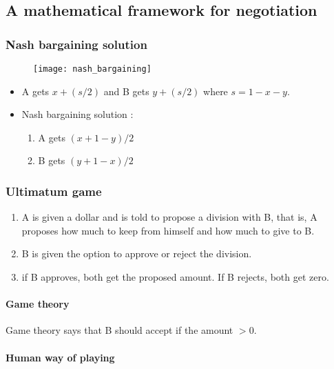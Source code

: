 \subsection{A mathematical framework for negotiation}

\subsubsection{Nash bargaining solution}

\begin{figure}[H]
    \centering
    \texttt{[image: nash\_bargaining]}
\end{figure}

\begin{itemize}
\item A gets $x + (s/2)$ and B gets $y + (s/2)$ where $s = 1 - x - y$.
\item Nash bargaining solution :
	\begin{enumerate}
	\item A gets $(x + 1 - y)/2$
	\item B gets $(y + 1 - x)/2$
	\end{enumerate}
\end{itemize}

\subsubsection{Ultimatum game}

\begin{enumerate}
\item A is given a dollar and is told to propose a division with B, that is, A proposes how much to keep from himself and how much to give to B.
\item B is given the option to approve or reject the division.
\item if B approves, both get the proposed amount. If B rejects, both get zero.
\end{enumerate}

\paragraph{Game theory}

Game theory says that B should accept if the amount $> 0$.

\paragraph{Human way of playing}

